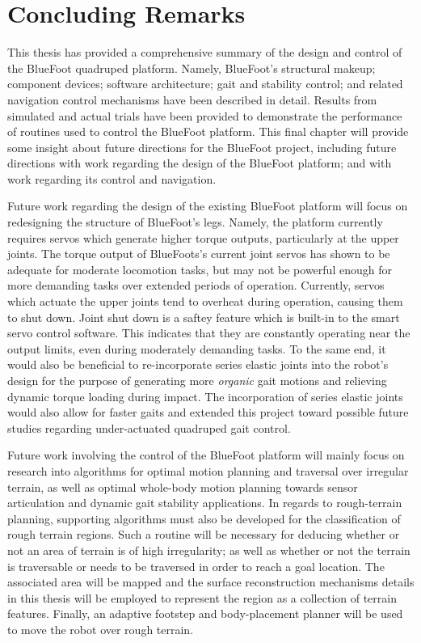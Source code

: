 \chapter{Concluding Remarks}


This thesis has provided a comprehensive summary of the design and control of the BlueFoot quadruped platform. Namely, BlueFoot's structural makeup; component devices; software architecture; gait and stability control; and related navigation control mechanisms have been described in detail. Results from simulated and actual trials have been provided to demonstrate the performance of routines used to control the BlueFoot platform. This final chapter will provide some insight about future directions for the BlueFoot project, including future directions with work regarding the design of the BlueFoot platform; and with work regarding its control and navigation.


Future work regarding the design of the existing BlueFoot platform will focus on redesigning the structure of BlueFoot's legs. Namely, the platform currently requires servos which generate higher torque outputs, particularly at the upper joints. The torque output of BlueFoots's current joint servos has shown to be adequate for moderate locomotion tasks, but may not be powerful enough for more demanding tasks over extended periods of operation. Currently, servos which actuate the upper joints tend to overheat during operation, causing them to shut down. Joint shut down is a saftey feature which is built-in to the smart servo control software. This indicates that they are constantly operating near the output limits, even during moderately demanding tasks. To the same end, it would also be beneficial to re-incorporate series elastic joints into the robot's design for the purpose of generating more \emph{organic} gait motions and relieving dynamic torque loading during impact. The incorporation of series elastic joints would also allow for faster gaits and extended this project toward possible future studies regarding under-actuated quadruped gait control.


Future work involving the control of the BlueFoot platform will mainly focus on research into algorithms for optimal motion planning and traversal over irregular terrain, as well as optimal whole-body motion planning towards sensor articulation and dynamic gait stability applications. In regards to rough-terrain planning, supporting algorithms must also be developed for the classification of rough terrain regions. Such a routine will be necessary for deducing whether or not an area of terrain is of high irregularity; as well as whether or not the terrain is traversable or needs to be traversed in order to reach a goal location. The associated area will be mapped and the surface reconstruction mechanisms details in this thesis will be employed to represent the region as a collection of terrain features. Finally, an adaptive footstep and body-placement planner will be used to move the robot over rough terrain. 


